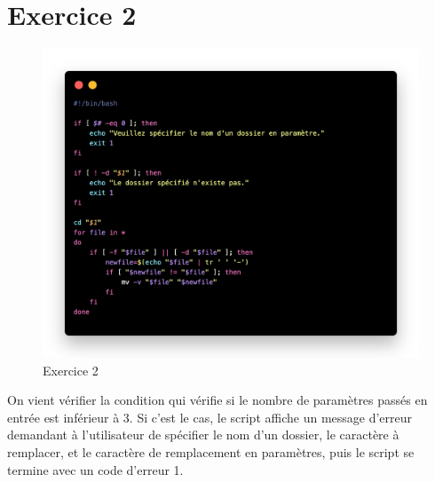 \documentclass[12pt, a4paper]{article}
\begin{document}
\section{Exercice 2}
\begin{figure}[h]
    \centering
    \includegraphics[width=1\textwidth]{img/exo2.png}
    \caption{Exercice 2}
    \label{fig:script3}
\end{figure}

On vient vérifier la condition qui vérifie si le nombre de paramètres 
passés en entrée est inférieur à 3. Si c'est le cas, le script affiche 
un message d'erreur demandant à l'utilisateur de spécifier le nom d'un 
dossier, le caractère à remplacer, et le caractère de remplacement en 
paramètres, puis le script se termine avec un code d'erreur 1.

\newpage
\end{document}
